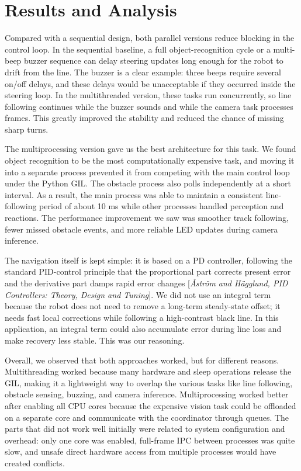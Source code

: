 \documentclass[10pt,a4paper]{article}
\begin{document}
\newpage
\section{Results and Analysis}
Compared with a sequential design, both parallel versions reduce blocking in the control loop. In the sequential baseline, a full object-recognition cycle or a multi-beep buzzer sequence can delay steering updates long enough for the robot to drift from the line. The buzzer is a clear example: three beeps require several on/off delays, and these delays would be unacceptable if they occurred inside the steering loop. In the multithreaded version, these tasks run concurrently, so line following continues while the buzzer sounds and while the camera task processes frames. This greatly improved the stability and reduced the chance of missing sharp turns.

The multiprocessing version gave us the best architecture for this task. We found object recognition to be the most computationally expensive task, and moving it into a separate process prevented it from competing with the main control loop under the Python GIL. The obstacle process also polls independently at a short interval. As a result, the main process was able to maintain a consistent line-following period of about 10 ms while other processes handled perception and reactions. The performance improvement we saw was smoother track following, fewer missed obstacle events, and more reliable LED updates during camera inference.

The navigation itself is kept simple: it is based on a PD controller, following the standard PID-control principle that the proportional part corrects present error and the derivative part damps rapid error changes [\textit{\AA str\"om and H\"agglund, PID Controllers: Theory, Design and Tuning}]. We did not use an integral term because the robot does not need to remove a long-term steady-state offset; it needs fast local corrections while following a high-contrast black line. In this application, an integral term could also accumulate error during line loss and make recovery less stable. This was our reasoning.

Overall, we observed that both approaches worked, but for different reasons. Multithreading worked because many hardware and sleep operations release the GIL, making it a lightweight way to overlap the various tasks like line following, obstacle sensing, buzzing, and camera inference. Multiprocessing worked better after enabling all CPU cores because the expensive vision task could be offloaded on a separate core and communicate with the coordinator through queues. The parts that did not work well initially were related to system configuration and overhead: only one core was enabled, full-frame IPC between processes was quite slow, and unsafe direct hardware access from multiple processes would have created conflicts.
\end{document}
